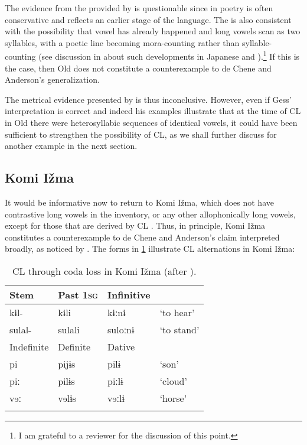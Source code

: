 \documentclass[output=paper,
modfonts
]{LSP/langsci}
\begin{document}
The evidence from the  provided by \citet{gess1998} is questionable
since  in poetry is often conservative and reflects an
earlier stage of the language. The  is also consistent with the
possibility that vowel  has already happened and long vowels
scan as two syllables, with a poetic line becoming mora-counting rather
than syllable-counting (see discussion in \citet[76, 84ff]{deChene1985}
about such developments in Japanese and ).\footnote{I am grateful
  to a reviewer for the discussion of this point.} If this is the case,
then Old  does not constitute a counterexample to de Chene and
Anderson's generalization.

The metrical evidence presented by \citet{gess1998} is thus inconclusive.
However, even if Gess' interpretation is correct and indeed his examples
illustrate that at the time of CL in Old  there were
heterosyllabic sequences of identical vowels, it could have been
sufficient to strengthen the possibility of CL, as we shall further
discuss for another example in the next section.

\subsection{Komi Ižma}

It would be informative now to return to Komi Ižma, which does not have
contrastive long vowels in the inventory, or any other allophonically
long vowels, except for those that are derived by CL \citep{lytkin1966,lytkin1976,hausenberg1998}. Thus, in principle, Komi
Ižma constitutes a counterexample to de Chene and Anderson's claim
interpreted broadly, as noticed by \citet{gess1998}. The forms in \cref{tab:clcodaloski}
illustrate CL alternations in Komi Ižma:

\begin{table}
\begin{tabular}{llll}
\lsptoprule
Stem	&	Past 1\textsc{sg}	&	Infinitive		&	\\
\midrule
kɨl- 		&	kɨli 			&	kɨːnɨ 			&	`to hear' \\
sulal- 		&	sulali 			&	suloːnɨ 			&	`to stand'\\
\midrule
Indefinite & 	Definite		&	Dative		&	\\
\midrule
pi 			&	pijɨs 			&	pilɨ 			&	`son'\\
piː 			&	pilɨs 			&	piːlɨ 			&	`cloud'\\
vɘː 			&	vɘlɨs 			&	vɘːlɨ 			&	`horse'\\
\lspbottomrule
\end{tabular}
\caption{CL through coda loss in Komi Ižma (after \citealt[104--105]{harms1968}).}
\label{tab:clcodaloski}
\end{table}
\end{document}
